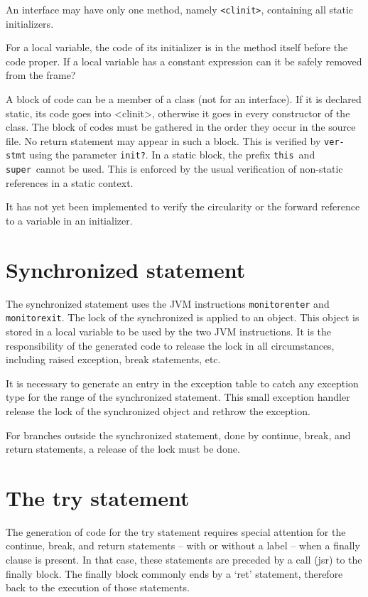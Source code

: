 \documentclass{book}
\newcommand{\func}[1]{\verb+#1+}
\newcommand{\var}[1]{\verb+#1+}
\newcommand{\jinst}[1]{\verb+#1+}
\begin{document}
An interface may have only one method, namely \verb+<clinit>+,
containing all static initializers.

For a local variable, the code of its initializer is in the method
itself before the code proper. If a local variable has a constant
expression can it be safely removed from the frame?

A block of code can be a member of a class (not for an interface).  If
it is declared static, its code goes into <clinit>, otherwise it goes
in every constructor of the class. The block of codes must be gathered
in the order they occur in the source file. No return statement may
appear in such a block. This is verified by \func{ver-stmt} using the
parameter \var{init?}. In a static block, the prefix \var{this}\ and
\var{super}\ cannot be used. This is enforced by the usual
verification of non-static references in a static context.

It has not yet been implemented to verify the circularity or the
forward reference to a variable in an initializer.


\section{Synchronized statement}

The synchronized statement uses the JVM instructions
\jinst{monitorenter} and \jinst{monitorexit}. The lock of the
synchronized is applied to an object. This object is stored in a local
variable to be used by the two JVM instructions. It is the
responsibility of the generated code to release the lock in all
circumstances, including raised exception, break statements, etc.

It is necessary to generate an entry in the exception table to catch
any exception type for the range of the synchronized statement. This
small exception handler release the lock of the synchronized object
and rethrow the exception.

For branches outside the synchronized statement, done by continue,
break, and return statements, a release of the lock must be done.

\section{The try statement}

The generation of code for the try statement requires special
attention for the continue, break, and return statements -- with or
without a label -- when a finally clause is present. In that case,
these statements are preceded by a call (jsr) to the finally
block. The finally block commonly ends by a `ret' statement, therefore
back to the execution of those statements.
\end{document}
